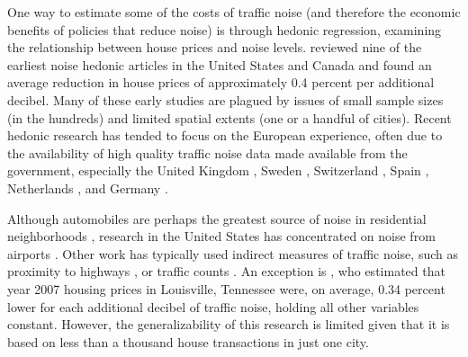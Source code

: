 \documentclass{article}\usepackage{graphicx, color}
\begin{document}

One way to estimate some of the costs of traffic noise (and therefore the economic benefits of policies that reduce noise) is through hedonic regression, examining the relationship between house prices and noise levels. \citet{Nelson1982} reviewed nine of the earliest noise hedonic articles in the United States and Canada and found an average reduction in house prices of approximately 0.4 percent per additional decibel. Many of these early studies \citep[such as][]{Gamble1974, Langley1976} are plagued by issues of small sample sizes (in the hundreds) and limited spatial extents (one or a handful of cities). Recent hedonic research has tended to focus on the European experience, often due to the availability of high quality traffic noise data made available from the government, especially the United Kingdom \citep{Day2007, Blanco2011}, Sweden \citep{Wilhelmsson2000, Andersson2010}, Switzerland \citep{Baranzini2010}, Spain \citep{MarmolejoDuarteCarlos;GonzalezTamez2009}, Netherlands \citep{Theebe2004a}, and Germany \citep{Brandt2011}. 


Although automobiles are perhaps the greatest source of noise in residential neighborhoods \citep{Barber2010}, research in the United States has concentrated on noise from airports \citep{Espey2000, McMillen2004, Cohen2008a}. Other work has typically used indirect measures of traffic noise, such as proximity to highways \citep{Matthews2007, Chernobai2009, Li2012}, or traffic counts \citep{HughesJr.1992, Larsen2012}. An exception is \citet{Cheng2008}, who estimated that year 2007 housing prices in Louisville, Tennessee were, on average, 0.34 percent lower for each additional decibel of traffic noise, holding all other variables constant. However, the generalizability of this research is limited given that it is based on less than a thousand house transactions in just one city. 
\end{document}
